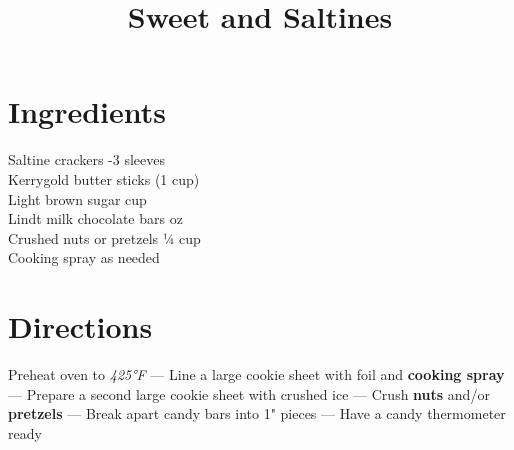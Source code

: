 \documentclass[11pt,letterpaper]{article}
\title{Sweet and Saltines}
\author{}
\date{}
\begin{document}
\maketitle
\thispagestyle{empty}

\section*{Ingredients}
\setlength{\columnsep}{20pt}
\begin{multicols}{2}
\noindent
    Saltine crackers -3 sleeves \\
    Kerrygold butter  sticks (1 cup) \\
    Light brown sugar  cup \\
    Lindt milk chocolate bars  oz\\
    Crushed nuts or pretzels \dotfill ¼ cup \\
    Cooking spray \dotfill as needed
\end{multicols}

\section*{Directions}

\noindent
Preheat oven to \textit{425°F} ---
Line a large cookie sheet with foil and \textbf{cooking spray}---
Prepare a second large cookie sheet with crushed ice ---
Crush \textbf{nuts} and/or \textbf{pretzels} ---
Break apart candy bars into 1" pieces ---
Have a candy thermometer ready
\end{document}
